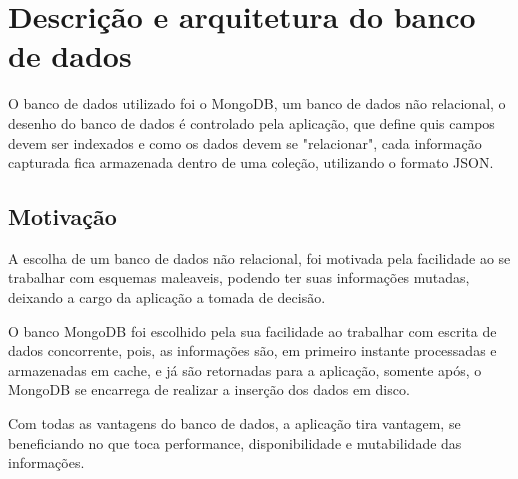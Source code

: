 \chapter{Descrição e arquitetura do banco de dados}

O banco de dados utilizado foi o MongoDB, um banco de dados não relacional, o desenho do banco de dados é controlado pela aplicação, que define quis campos devem ser indexados e como os dados devem se "relacionar", cada informação capturada fica armazenada dentro de uma coleção, utilizando o formato JSON.

\section{Motivação}

A escolha de um banco de dados não relacional, foi motivada pela facilidade ao se trabalhar com esquemas maleaveis, podendo ter suas informações mutadas, deixando a cargo da aplicação a tomada de decisão.

O banco MongoDB foi escolhido pela sua facilidade ao trabalhar com escrita de dados concorrente, pois, as informações são, em primeiro instante processadas e armazenadas em cache, e já são retornadas para a aplicação, somente após, o MongoDB se encarrega de realizar a inserção dos dados em disco.

Com todas as vantagens do banco de dados, a aplicação tira vantagem, se beneficiando no que toca performance, disponibilidade e mutabilidade das informações.